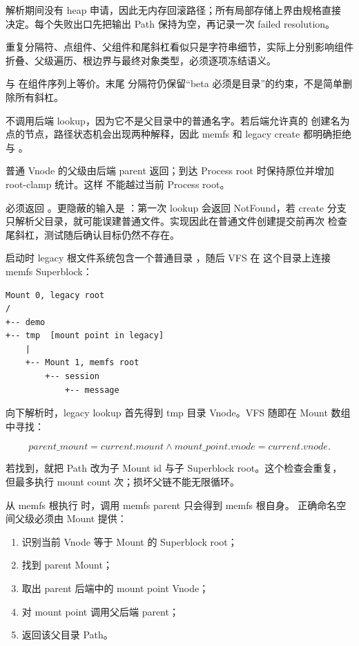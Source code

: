 解析期间没有 heap 申请，因此无内存回滚路径；所有局部存储上界由规格直接
决定。每个失败出口先把输出 Path 保持为空，再记录一次 failed resolution。

重复分隔符、点组件、父组件和尾斜杠看似只是字符串细节，实际上分别影响组件
折叠、父级遍历、根边界与最终对象类型，必须逐项冻结语义。


 与  在组件序列上等价。末尾
分隔符仍保留“beta 必须是目录”的约束，不是简单删除所有斜杠。


 不调用后端 lookup，因为它不是父目录中的普通名字。若后端允许真的
创建名为点的节点，路径状态机会出现两种解释，因此 memfs 和 legacy create
都明确拒绝  与 。


普通 Vnode 的父级由后端 parent 返回；到达 Process root 时保持原位并增加
root-clamp 统计。这样  不能越过当前 Process root。


 必须返回 。更隐蔽的输入是
：第一次 lookup 会返回 NotFound，若 create
分支只解析父目录，就可能误建普通文件。实现因此在普通文件创建提交前再次
检查尾斜杠，测试随后确认目标仍然不存在。

启动时 legacy 根文件系统包含一个普通目录 ，随后 VFS 在
这个目录上连接 memfs Superblock：

\begin{lstlisting}[caption={当前两层挂载树}]
Mount 0, legacy root
/
+-- demo
+-- tmp  [mount point in legacy]
    |
    +-- Mount 1, memfs root
        +-- session
            +-- message
\end{lstlisting}

向下解析时，legacy lookup 首先得到 tmp 目录 Vnode。VFS 随即在 Mount 数组
中寻找：

\[
  parent\_mount = current.mount
  \land mount\_point.vnode = current.vnode.
\]

若找到，就把 Path 改为子 Mount id 与子 Superblock root。这个检查会重复，
但最多执行 mount count 次；损坏父链不能无限循环。

从 memfs 根执行  时，调用 memfs parent 只会得到 memfs 根自身。
正确命名空间父级必须由 Mount 提供：

\begin{enumerate}
  \item 识别当前 Vnode 等于 Mount 的 Superblock root；
  \item 找到 parent Mount；
  \item 取出 parent 后端中的 mount point Vnode；
  \item 对 mount point 调用父后端 parent；
  \item 返回该父目录 Path。
\end{enumerate}

